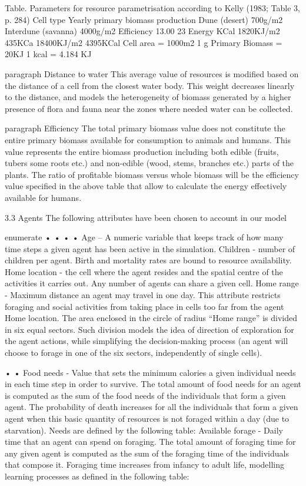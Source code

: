 Table. Parameters for resource parametrisation according to Kelly (1983; Table 3, p. 284)
Cell type
Yearly primary biomass production
Dune (desert)
700g/m2
Interdune (savanna)
4000g/m2
Efficiency
13.00%
23%
Energy
KCal
1820KJ/m2
435KCa
18400KJ/m2
4395KCal
Cell area = 1000m2
1 g Primary Biomass = 20KJ
1 kcal = 4.184 KJ

paragraph
Distance to water
This average value of resources is modified based on the distance of a cell from the closest
water body. This weight decreases linearly to the distance, and models the heterogeneity of
biomass generated by a higher presence of flora and fauna near the zones where needed
water can be collected.

paragraph
Efficiency
The total primary biomass value does not constitute the entire primary biomass available for
consumption to animals and humans. This value represents the entire biomass production
including both edible (fruits, tubers some roots etc.) and non-edible (wood, stems, branches
etc.) parts of the plants. The ratio of profitable biomass versus whole biomass will be the
efficiency value specified in the above table that allow to calculate the energy effectively
available for humans.

3.3 Agents
The following attributes have been chosen to account in our model

enumerate
•
•
•
•
Age – A numeric variable that keeps track of how many time steps a given agent has been
active in the simulation.
Children - number of children per agent. Birth and mortality rates are bound to resource
availability.
Home location - the cell where the agent resides and the spatial centre of the activities it
carries out. Any number of agents can share a given cell.
Home range - Maximum distance an agent may travel in one day. This attribute restricts
foraging and social activities from taking place in cells too far from the agent Home location.
The area enclosed in the circle of radius “Home range” is divided in six equal sectors. Such
division models the idea of direction of exploration for the agent actions, while simplifying the
decision-making process (an agent will choose to forage in one of the six sectors,
independently of single cells).

•
•
Food needs - Value that sets the minimum calories a given individual needs in each time step
in order to survive. The total amount of food needs for an agent is computed as the sum of the
food needs of the individuals that form a given agent. The probability of death increases for all
the individuals that form a given agent when this basic quantity of resources is not foraged
within a day (due to starvation). Needs are defined by the following table:
Available forage - Daily time that an agent can spend on foraging. The total amount of
foraging time for any given agent is computed as the sum of the foraging time of the
individuals that compose it. Foraging time increases from infancy to adult life, modelling
learning processes as defined in the following table:


